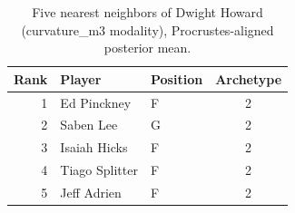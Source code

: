 \begin{table}[htbp]
  \centering\small
  \begin{tabular}{rllc}
    \toprule
    Rank & Player & Position & Archetype \\
    \midrule
    1 & Ed Pinckney & F & 2 \\
    2 & Saben Lee & G & 2 \\
    3 & Isaiah Hicks & F & 2 \\
    4 & Tiago Splitter & F & 2 \\
    5 & Jeff Adrien & F & 2 \\
    \bottomrule
  \end{tabular}
  \caption{Five nearest neighbors of Dwight Howard (curvature_m3 modality), Procrustes-aligned posterior mean.}
  \label{tab:Dwight_Howard_neighbors_curvature_m3}
\end{table}

